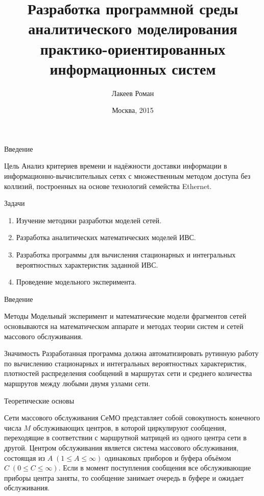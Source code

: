 \documentclass[aspectratio=169]{beamer}
\title{Разработка программной среды аналитического моделирования практико-ориентированных информационных систем}
\author[Лакеев Р.Д.]{Лакеев Роман}
\institute[МГТУ <<СТАНКИН>>]{ФГБОУ ВПО МГТУ <<СТАНКИН>>}
\date{Москва, 2015}
\begin{document}
\maketitle

\begin{frame}{Введение}
\begin{block}{Цель}
Анализ критериев времени и надёжности доставки информации в информационно-вычислительных сетях с множественным методом доступа без коллизий, построенных на основе технологий семейства Ethernet.	
\end{block}

\begin{block}{Задачи}
\begin{enumerate}
	\item Изучение методики разработки моделей сетей.
	\item Разработка аналитических математических моделей ИВС.
	\item Разработка программы для вычисления стационарных и интегральных вероятностных характеристик заданной ИВС.
	\item Проведение модельного эксперимента.
\end{enumerate}
\end{block}
\end{frame}

\begin{frame}{Введение}
\begin{block}{Методы}
Модельный эксперимент и математические модели фрагментов сетей
основываются на математическом аппарате и методах теории систем и сетей массового обслуживания.
\end{block}

\begin{block}{Значимость}
Разработанная программа должна автоматизировать рутинную работу по вычислению стационарных и интегральных вероятностных характеристик, плотностей распределения сообщений в маршрутах сети и среднего количества маршрутов между любыми двумя узлами сети.
\end{block}

\end{frame}

\begin{frame}{Теоретические основы}
\begin{block}{Сети массового обслуживания}
СеМО представляет собой совокупность конечного числа \( M \) обслуживающих центров, в которой циркулируют сообщения,
переходящие в соответствии с маршрутной матрицей из одного центра сети в другой.
Центром обслуживания является система массового обслуживания, состоящая из \( A \; (1 \leqslant A \leqslant \infty) \) одинаковых приборов
и буфера объёмом \( C \; (0 \leqslant C \leqslant \infty) \). Если в момент поступления сообщения все обслуживающие приборы центра заняты, то сообщение занимает очередь в буфере и ожидает обслуживания.
\end{block}
\end{frame}
\end{document}
